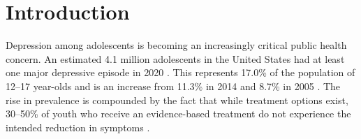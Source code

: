 \section{Introduction}

Depression among adolescents is becoming an increasingly critical public health concern. An estimated 4.1 million adolescents in the United States had at least one
major depressive episode in 2020 \citep{substance_abuse_and_mental_health_services_administration_key_2021}. This represents
17.0\% of the population of 12–17 year-olds and is an
increase from 11.3\% in 2014 and 8.7\% in 2005 \citep{substance_abuse_and_mental_health_services_administration_key_2021,mojtabai_national_2016}. The
rise in prevalence is compounded by the fact that while
treatment options exist, 30–50\% of youth who receive an
evidence-based treatment do not experience the intended
reduction in symptoms \citep{treatment_for_adolescents_with_depression_study_tads_team_fluoxetine_2004, mufson_randomized_2004}.
